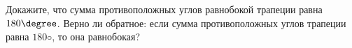 \begin{ex}
	\begin{condition}
		Докажите, что сумма противоположных углов равнобокой трапеции равна \( 180\degree \). Верно ли обратное: если сумма противоположных углов трапеции равна \( 180◦ \), то она равнобокая?
	\end{condition}
\end{ex}
